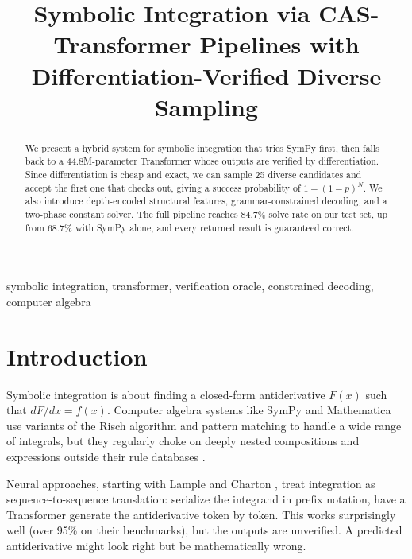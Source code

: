 \documentclass[conference]{IEEEtran}
\begin{document}
\title{Symbolic Integration via CAS-Transformer Pipelines with Differentiation-Verified Diverse Sampling}

\author{
}

\maketitle

\begin{abstract}
We present a hybrid system for symbolic integration that tries SymPy first, then falls back to a 44.8M-parameter Transformer whose outputs are verified by differentiation. Since differentiation is cheap and exact, we can sample 25 diverse candidates and accept the first one that checks out, giving a success probability of $1 - (1 - p)^N$. We also introduce depth-encoded structural features, grammar-constrained decoding, and a two-phase constant solver. The full pipeline reaches 84.7\% solve rate on our test set, up from 68.7\% with SymPy alone, and every returned result is guaranteed correct.
\end{abstract}

\begin{IEEEkeywords}
symbolic integration, transformer, verification oracle, constrained decoding, computer algebra
\end{IEEEkeywords}

\section{Introduction}

Symbolic integration is about finding a closed-form antiderivative $F(x)$ such that $dF/dx = f(x)$. Computer algebra systems like SymPy and Mathematica use variants of the Risch algorithm \cite{b28} and pattern matching to handle a wide range of integrals, but they regularly choke on deeply nested compositions and expressions outside their rule databases \cite{b24}.

Neural approaches, starting with Lample and Charton \cite{b19}, treat integration as sequence-to-sequence translation: serialize the integrand in prefix notation, have a Transformer generate the antiderivative token by token. This works surprisingly well (over 95\% on their benchmarks), but the outputs are unverified. A predicted antiderivative might look right but be mathematically wrong.
\end{document}
